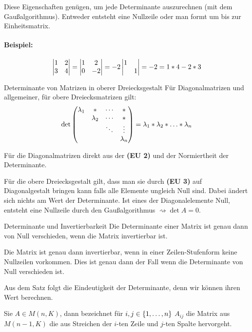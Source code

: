 \bemerkung
Diese Eigenschaften genügen, um jede Determinante auszurechnen (mit dem Gaußalgorithmus). Entweder entsteht eine Nullzeile oder man formt um bis zur Einheitsmatrix.

\paragraph{Beispiel:}
\begin{equation*}
	\detmatrix{1 & 2\\3 & 4}=\detmatrix{1 & 2\\ 0 & -2}= -2\detmatrix{1 & \\ & 1}=-2=1*4-2*3
\end{equation*}

\begin{lemma}{Determinante von Matrizen in oberer Dreiecksgestalt}
	Für Diagonalmatrizen und allgemeiner, für obere Dreiecksmatrizen gilt:
	\begin{equation*}
		\det\matrix{\lambda_1 & \ast & \cdots & \ast \\&\lambda_2& \cdots & \ast\\&&\ddots&\vdots\\&&&\lambda_n}=\lambda_1*\lambda_2*\ldots*\lambda_n
	\end{equation*}
\end{lemma}
\beweis
Für die Diagonalmatrizen direkt aus der \textbf{(EU 2)} und der Normiertheit der Determinante.

Für die obere Dreiecksgestalt gilt, dass man sie durch \textbf{(EU 3)} auf Diagonalgestalt bringen kann falls alle Elemente ungleich Null sind. Dabei ändert sich nichts am Wert der Determinante.
Ist eines der Diagonalelemente Null, entsteht eine Nullzeile durch den Gaußalgorithmus $\rightsquigarrow \det A =0$.

\begin{satz}{Determinante und Invertierbarkeit}
	Die Determinante einer Matrix ist genau dann von Null verschieden, wenn die Matrix invertierbar ist.
\end{satz}

\beweis
Die Matrix ist genau dann invertierbar, wenn in einer Zeilen-Stufenform keine Nullzeilen vorkommen. Dies ist genau dann der Fall wenn die Determinante von Null verschieden ist.

\bemerkung
Aus dem Satz folgt die Eindeutigkeit der Determinante, denn wir können ihren Wert berechnen.

\begin{satz}{}
	Sie $A\in M(n,K)$, dann bezeichnet für $i,j\in\left\{ 1,\ldots,n \right\}$ $A_{ij}$ die Matrix aus $M(n-1,K)$ die aus Streichen der $i$-ten Zeile und $j$-ten Spalte hervorgeht.
\end{satz}
